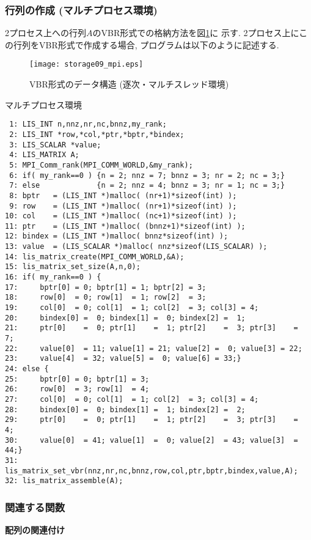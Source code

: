 \documentclass[a4paper]{jarticle}
\begin{document}
{{\newpage
\subsubsection{行列の作成 (マルチプロセス環境)}
2プロセス上への行列$A$のVBR形式での格納方法を図\ref{fig:storage09_mpi}に
示す. 
2プロセス上にこの行列をVBR形式で作成する場合, プログラムは以下のように記述する. 
\begin{figure}[h]
{\centering 
\texttt{[image: storage09\_mpi.eps]} 
\caption{VBR形式のデータ構造 (逐次・マルチスレッド環境)}\label{fig:storage09_mpi}}
\end{figure}
\begin{itembox}[l]{マルチプロセス環境}
\small
\begin{verbatim}
 1: LIS_INT n,nnz,nr,nc,bnnz,my_rank;
 2: LIS_INT *row,*col,*ptr,*bptr,*bindex;
 3: LIS_SCALAR *value;
 4: LIS_MATRIX A;
 5: MPI_Comm_rank(MPI_COMM_WORLD,&my_rank);
 6: if( my_rank==0 ) {n = 2; nnz = 7; bnnz = 3; nr = 2; nc = 3;}
 7: else             {n = 2; nnz = 4; bnnz = 3; nr = 1; nc = 3;}
 8: bptr   = (LIS_INT *)malloc( (nr+1)*sizeof(int) );
 9: row    = (LIS_INT *)malloc( (nr+1)*sizeof(int) );
10: col    = (LIS_INT *)malloc( (nc+1)*sizeof(int) );
11: ptr    = (LIS_INT *)malloc( (bnnz+1)*sizeof(int) );
12: bindex = (LIS_INT *)malloc( bnnz*sizeof(int) );
13: value  = (LIS_SCALAR *)malloc( nnz*sizeof(LIS_SCALAR) );
14: lis_matrix_create(MPI_COMM_WORLD,&A);
15: lis_matrix_set_size(A,n,0);
16: if( my_rank==0 ) {
17:     bptr[0] = 0; bptr[1] = 1; bptr[2] = 3;
18:     row[0]  = 0; row[1]  = 1; row[2]  = 3;
19:     col[0]  = 0; col[1]  = 1; col[2]  = 3; col[3] = 4;
20:     bindex[0] =  0; bindex[1] =  0; bindex[2] =  1;
21:     ptr[0]    =  0; ptr[1]    =  1; ptr[2]    =  3; ptr[3]    =  7;
22:     value[0]  = 11; value[1] = 21; value[2] =  0; value[3] = 22;
23:     value[4]  = 32; value[5] =  0; value[6] = 33;}
24: else {
25:     bptr[0] = 0; bptr[1] = 3;
26:     row[0]  = 3; row[1]  = 4;
27:     col[0]  = 0; col[1]  = 1; col[2]  = 3; col[3] = 4;
28:     bindex[0] =  0; bindex[1] =  1; bindex[2] =  2;
29:     ptr[0]    =  0; ptr[1]    =  1; ptr[2]    =  3; ptr[3]    =  4;
30:     value[0]  = 41; value[1]  =  0; value[2]  = 43; value[3]  = 44;}
31: lis_matrix_set_vbr(nnz,nr,nc,bnnz,row,col,ptr,bptr,bindex,value,A);
32: lis_matrix_assemble(A);
\end{verbatim}
\end{itembox}

\subsubsection{関連する関数}
\noindent
{\bf 配列の関連付け}

}}
\end{document}
